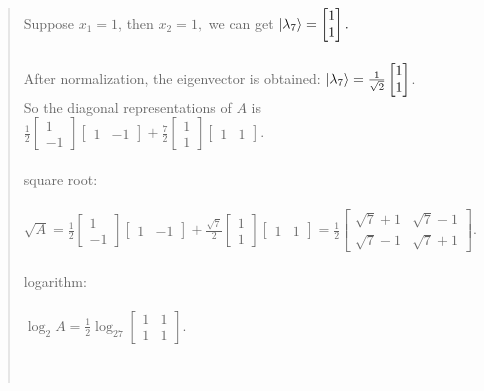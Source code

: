 \documentclass[UTF8]{ctexart}
\begin{document}
\begin{quote}
		Suppose $x_{1}=1$, then  $x_{2}=1, $ we can get  
		$\ket{\lambda_{7}}=\begin{bmatrix}1\\ 1 \end{bmatrix}.$\\
		\\
	After normalization, the eigenvector is obtained:
		$\ket{\lambda_{7}}=\frac{1}{\sqrt{2}}\begin{bmatrix}1\\ 1 \end{bmatrix}$.
		\\
			So the diagonal representations of $A$ is 
	$\frac{1}{2}\begin{bmatrix}1\\ -1 \end{bmatrix}\begin{bmatrix}1& -1 \end{bmatrix}+
	\frac{7}{2}\begin{bmatrix}1\\ 1 \end{bmatrix}\begin{bmatrix}1& 1 \end{bmatrix}.$
	\\ \\
	square root:\\ 
	\\
	$\sqrt{A}=\frac{1}{2}\begin{bmatrix}1\\ -1 \end{bmatrix}\begin{bmatrix}1& -1 \end{bmatrix}+
	\frac{\sqrt{7}}{2}\begin{bmatrix}1\\ 1 \end{bmatrix}\begin{bmatrix}1& 1 \end{bmatrix}
		=\frac{1}{2}\begin{bmatrix}\sqrt{7}+1 & \sqrt{7}-1\\ \sqrt{7}-1 & \sqrt{7}+1 \end{bmatrix}.$
		\\  \\
	logarithm:\\ 
	\\
		$\log_2A=\frac{1}{2}\log_27\begin{bmatrix}1 & 1\\ 1 &1\end{bmatrix}.$
		 \\ \\ \\

\end{quote}
\end{document}
